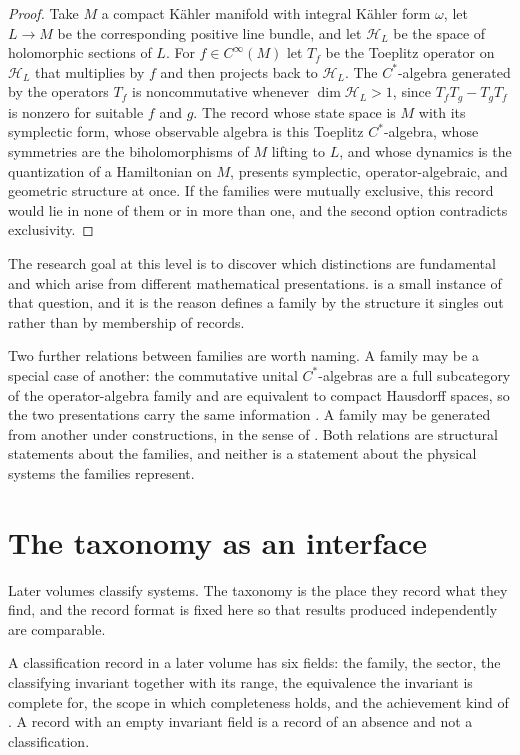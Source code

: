 \documentclass[11pt,letterpaper]{article}
\theoremstyle{definition}
\theoremstyle{remark}
\begin{document}
\begin{proof}
Take $M$ a compact K\"{a}hler manifold with integral K\"{a}hler form $\omega$, let $L \to M$ be the corresponding positive line bundle, and let $\mathcal{H}_L$ be the space of holomorphic sections of $L$. For $f \in C^\infty(M)$ let $T_f$ be the Toeplitz operator on $\mathcal{H}_L$ that multiplies by $f$ and then projects back to $\mathcal{H}_L$. The $C^*$-algebra generated by the operators $T_f$ is noncommutative whenever $\dim \mathcal{H}_L > 1$, since $T_f T_g - T_g T_f$ is nonzero for suitable $f$ and $g$. The record whose state space is $M$ with its symplectic form, whose observable algebra is this Toeplitz $C^*$-algebra, whose symmetries are the biholomorphisms of $M$ lifting to $L$, and whose dynamics is the quantization of a Hamiltonian on $M$, presents symplectic, operator-algebraic, and geometric structure at once. If the families were mutually exclusive, this record would lie in none of them or in more than one, and the second option contradicts exclusivity.
\end{proof}

The research goal at this level is to discover which distinctions are fundamental and which arise from different mathematical presentations.  is a small instance of that question, and it is the reason  defines a family by the structure it singles out rather than by membership of records.

Two further relations between families are worth naming. A family may be a special case of another: the commutative unital $C^*$-algebras are a full subcategory of the operator-algebra family and are equivalent to compact Hausdorff spaces, so the two presentations carry the same information \cite{gelfand-duality}. A family may be generated from another under constructions, in the sense of . Both relations are structural statements about the families, and neither is a statement about the physical systems the families represent.

\section{The taxonomy as an interface}
\label{sec:interface}

Later volumes classify systems. The taxonomy is the place they record what they find, and the record format is fixed here so that results produced independently are comparable.

A classification record in a later volume has six fields: the family, the sector, the classifying invariant together with its range, the equivalence the invariant is complete for, the scope in which completeness holds, and the achievement kind of . A record with an empty invariant field is a record of an absence and not a classification.
\end{document}

